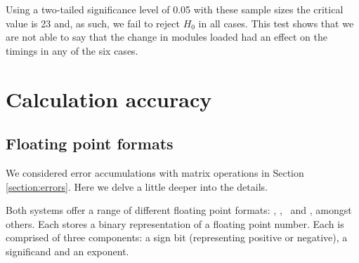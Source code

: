 \begin{table}[t]
    \centering
    \caption{Mann Whitney U Test calculations comparing the times for runs using the {\tt rhel8} and {\tt rhel9} modules}
    \label{tab:timing-mann-whitney}
\end{table}

Using a two-tailed significance level of 0.05 with these sample sizes the critical value is 23 and, as such, we fail to reject $H_0$ in all cases. This test shows that we are not able to say that the change in modules loaded had an effect on the timings in any of the six cases.

\section{Calculation accuracy}
\label{appendix:calcs}

\subsection{Floating point formats}

We considered error accumulations with matrix operations in Section \ref{section:errors}. Here we delve a little deeper into the details.

Both systems offer a range of different floating point formats: \fpdouble, \fpsingle, \fphalf\ and \bfhalf, amongst others. Each stores a binary representation of a floating point number. Each is comprised of three components: a sign bit (representing positive or negative), a significand and an exponent.

